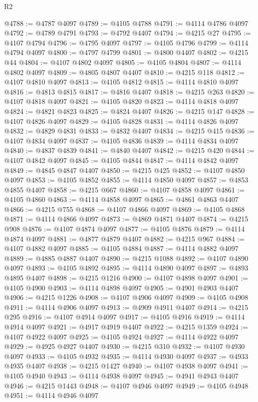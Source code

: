 \begin{lexlean}{R2}
\begin{coremodule}
@4788 := @4787 @4097
@4789 := @4105 @4788
@4791 := @4114 @4786 @4097
@4792 := @4789 @4791
@4793 := @4792 @4407
@4794 := @4215 @27
@4795 := @4107 @4794
@4796 := @4795 @4097
@4797 := @4105 @4796
@4799 := @4114 @4794 @4097
@4800 := @4797 @4799
@4801 := @4800 @4407
@4802 := @4215 @44
@4804 := @4107 @4802 @4097
@4805 := @4105 @4804
@4807 := @4114 @4802 @4097
@4809 := @4805 @4807 @4407
@4810 := @4215 @118
@4812 := @4107 @4810 @4097
@4813 := @4105 @4812
@4815 := @4114 @4810 @4097
@4816 := @4813 @4815
@4817 := @4816 @4407
@4818 := @4215 @263
@4820 := @4107 @4818 @4097
@4821 := @4105 @4820
@4823 := @4114 @4818 @4097
@4824 := @4821 @4823
@4825 := @4824 @4407
@4826 := @4215 @147
@4828 := @4107 @4826 @4097
@4829 := @4105 @4828
@4831 := @4114 @4826 @4097
@4832 := @4829 @4831
@4833 := @4832 @4407
@4834 := @4215 @415
@4836 := @4107 @4834 @4097
@4837 := @4105 @4836
@4839 := @4114 @4834 @4097
@4840 := @4837 @4839
@4841 := @4840 @4407
@4842 := @4215 @420
@4844 := @4107 @4842 @4097
@4845 := @4105 @4844
@4847 := @4114 @4842 @4097
@4849 := @4845 @4847 @4407
@4850 := @4215 @425
@4852 := @4107 @4850 @4097
@4853 := @4105 @4852
@4855 := @4114 @4850 @4097
@4857 := @4853 @4855 @4407
@4858 := @4215 @667
@4860 := @4107 @4858 @4097
@4861 := @4105 @4860
@4863 := @4114 @4858 @4097
@4865 := @4861 @4863 @4407
@4866 := @4215 @755
@4868 := @4107 @4866 @4097
@4869 := @4105 @4868
@4871 := @4114 @4866 @4097
@4873 := @4869 @4871 @4407
@4874 := @4215 @908
@4876 := @4107 @4874 @4097
@4877 := @4105 @4876
@4879 := @4114 @4874 @4097
@4881 := @4877 @4879 @4407
@4882 := @4215 @967
@4884 := @4107 @4882 @4097
@4885 := @4105 @4884
@4887 := @4114 @4882 @4097
@4889 := @4885 @4887 @4407
@4890 := @4215 @1088
@4892 := @4107 @4890 @4097
@4893 := @4105 @4892
@4895 := @4114 @4890 @4097
@4897 := @4893 @4895 @4407
@4898 := @4215 @1216
@4900 := @4107 @4898 @4097
@4901 := @4105 @4900
@4903 := @4114 @4898 @4097
@4905 := @4901 @4903 @4407
@4906 := @4215 @1226
@4908 := @4107 @4906 @4097
@4909 := @4105 @4908
@4911 := @4114 @4906 @4097
@4913 := @4909 @4911 @4407
@4914 := @4215 @295
@4916 := @4107 @4914 @4097
@4917 := @4105 @4916
@4919 := @4114 @4914 @4097
@4921 := @4917 @4919 @4407
@4922 := @4215 @1359
@4924 := @4107 @4922 @4097
@4925 := @4105 @4924
@4927 := @4114 @4922 @4097
@4929 := @4925 @4927 @4407
@4930 := @4215 @310
@4932 := @4107 @4930 @4097
@4933 := @4105 @4932
@4935 := @4114 @4930 @4097
@4937 := @4933 @4935 @4407
@4938 := @4215 @1427
@4940 := @4107 @4938 @4097
@4941 := @4105 @4940
@4943 := @4114 @4938 @4097
@4945 := @4941 @4943 @4407
@4946 := @4215 @1443
@4948 := @4107 @4946 @4097
@4949 := @4105 @4948
@4951 := @4114 @4946 @4097

\end{coremodule}
\end{lexlean}
